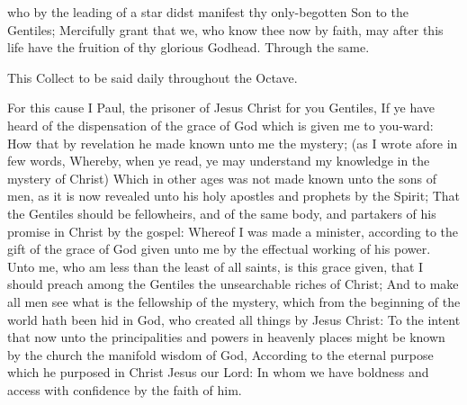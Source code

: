 \collect\label{EpiphanyMassCollect}
 who by the leading of a star didst manifest thy only-begotten Son to the Gentiles; Mercifully grant that we, who know thee now by faith, may after this life have the fruition of thy glorious Godhead. Through the same.
\begin{rubric}
    This Collect to be said daily throughout the Octave.
\end{rubric}
 For this cause I Paul, the prisoner of Jesus Christ for you Gentiles, If ye have heard of the dispensation of the grace of God which is given me to you-ward: How that by revelation he made known unto me the mystery; (as I wrote afore in few words, Whereby, when ye read, ye may understand my knowledge in the mystery of Christ) Which in other ages was not made known unto the sons of men, as it is now revealed unto his holy apostles and prophets by the Spirit; That the Gentiles should be fellowheirs, and of the same body, and partakers of his promise in Christ by the gospel: Whereof I was made a minister, according to the gift of the grace of God given unto me by the effectual working of his power. Unto me, who am less than the least of all saints, is this grace given, that I should preach among the Gentiles the unsearchable riches of Christ; And to make all men see what is the fellowship of the mystery, which from the beginning of the world hath been hid in God, who created all things by Jesus Christ: To the intent that now unto the principalities and powers in heavenly places might be known by the church the manifold wisdom of God, According to the eternal purpose which he purposed in Christ Jesus our Lord: In whom we have boldness and access with confidence by the faith of him.



